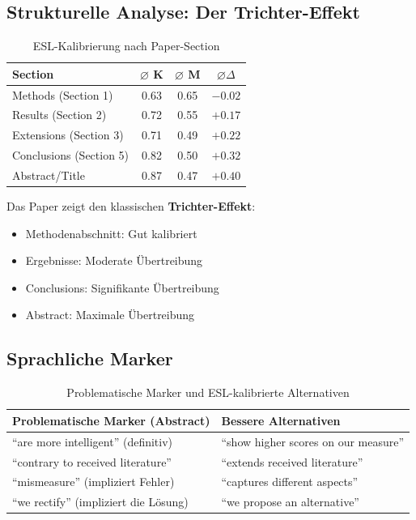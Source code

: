 \subsection{Strukturelle Analyse: Der Trichter-Effekt}

\begin{table}[H]
\centering
\caption{ESL-Kalibrierung nach Paper-Section}
\begin{tabular}{lccc}
\toprule
\textbf{Section} & \textbf{$\varnothing$ K} & \textbf{$\varnothing$ M} & \textbf{$\varnothing \Delta$} \\
\midrule
Methods (Section 1) & 0.63 & 0.65 & $-0.02$ \\
Results (Section 2) & 0.72 & 0.55 & $+0.17$ \\
Extensions (Section 3) & 0.71 & 0.49 & $+0.22$ \\
Conclusions (Section 5) & 0.82 & 0.50 & $+0.32$ \\
Abstract/Title & 0.87 & 0.47 & $+0.40$ \\
\bottomrule
\end{tabular}
\end{table}

Das Paper zeigt den klassischen \textbf{Trichter-Effekt}:
\begin{itemize}
    \item Methodenabschnitt: Gut kalibriert
    \item Ergebnisse: Moderate \"Ubertreibung
    \item Conclusions: Signifikante \"Ubertreibung
    \item Abstract: Maximale \"Ubertreibung
\end{itemize}


\subsection{Sprachliche Marker}

\begin{table}[H]
\centering
\caption{Problematische Marker und ESL-kalibrierte Alternativen}
\begin{tabular}{p{5.5cm}|p{5.5cm}}
\toprule
\textbf{Problematische Marker (Abstract)} & \textbf{Bessere Alternativen} \\
\midrule
``are more intelligent'' (definitiv) & ``show higher scores on our measure'' \\
``contrary to received literature'' & ``extends received literature'' \\
``mismeasure'' (impliziert Fehler) & ``captures different aspects'' \\
``we rectify'' (impliziert die L\"osung) & ``we propose an alternative'' \\
\bottomrule
\end{tabular}
\end{table}


